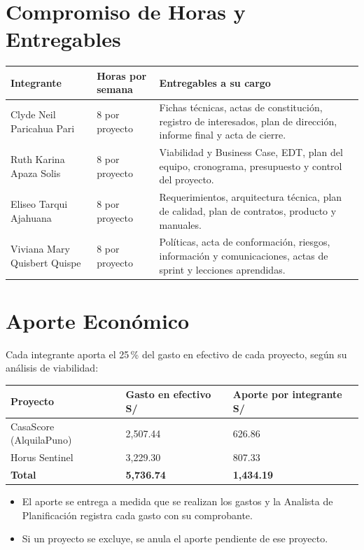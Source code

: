 \documentclass[11pt,a4paper]{article}
\begin{document}
\section{Compromiso de Horas y Entregables}
{\small
\noindent\begin{tabularx}{\textwidth}{@{}P{3.6cm} C{1.8cm} L@{}}
\toprule
{}
\textbf{Integrante} & \textbf{Horas por semana} & \textbf{Entregables a su cargo} \\
\midrule
Clyde Neil Paricahua Pari & 8 por proyecto & Fichas técnicas, actas de constitución, registro de interesados, plan de dirección, informe final y acta de cierre. \\
Ruth Karina Apaza Solis & 8 por proyecto & Viabilidad y Business Case, EDT, plan del equipo, cronograma, presupuesto y control del proyecto. \\
Eliseo Tarqui Ajahuana & 8 por proyecto & Requerimientos, arquitectura técnica, plan de calidad, plan de contratos, producto y manuales. \\
Viviana Mary Quisbert Quispe & 8 por proyecto & Políticas, acta de conformación, riesgos, información y comunicaciones, actas de sprint y lecciones aprendidas. \\
\bottomrule
\end{tabularx}
}

\section{Aporte Económico}
Cada integrante aporta el 25\,\% del gasto en efectivo de cada proyecto, según su análisis de viabilidad:

\vspace{0.1cm}
{\small
\noindent\begin{tabularx}{\textwidth}{@{}L Q{2.6cm} Q{2.8cm}@{}}
\toprule
{}
\textbf{Proyecto} & \textbf{Gasto en efectivo S/} & \textbf{Aporte por integrante S/} \\
\midrule
CasaScore (AlquilaPuno) & 2,507.44 & 626.86 \\
Horus Sentinel & 3,229.30 & 807.33 \\
\midrule
\textbf{Total} & \textbf{5,736.74} & \textbf{1,434.19} \\
\bottomrule
\end{tabularx}
}

\vspace{0.1cm}
\begin{itemize}[leftmargin=*]
    \item El aporte se entrega a medida que se realizan los gastos y la Analista de Planificación registra cada gasto con su comprobante.
    \item Si un proyecto se excluye, se anula el aporte pendiente de ese proyecto.
\end{itemize}
\end{document}
